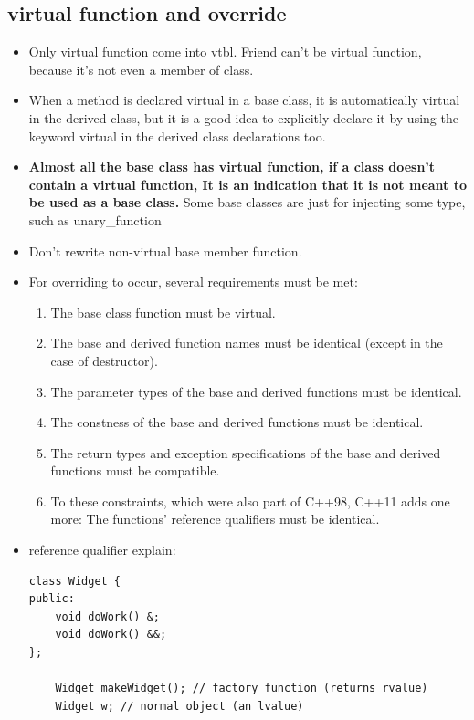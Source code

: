 \documentclass[a4paper,11pt,twoside]{book}
\begin{document}
\subsection{virtual function and override}
\begin{itemize}
	
	\item Only virtual function come into vtbl. Friend can't be virtual function, because it's not even a member of class.
	
	\item When a method is declared virtual in a base class, it is automatically virtual in the derived class, but it is a good idea to explicitly declare it by using the keyword virtual in the derived class declarations too.
	
	\item \textbf{Almost all the base class has virtual function, if a class doesn't contain a virtual function, It is an indication that it is not meant to be used as a base class.} Some base classes are just for injecting some type, such as unary\_function 
	
	\item Don't rewrite non-virtual base member function.
	
	\item For overriding to occur, several requirements must be met:
	\begin{enumerate}
		\item The base class function must be virtual.
		\item The base and derived function names must be identical (except in the case of
		destructor).
		\item The parameter types of the base and derived functions must be identical.
		\item The constness of the base and derived functions must be identical.
		\item The return types and exception specifications of the base and derived functions
		must be compatible.
		\item To these constraints, which were also part of C++98, C++11 adds one more: The functions' reference qualifiers must be identical.
	\end{enumerate}
	\item reference qualifier explain:
\begin{lstlisting}
class Widget {
public:
	void doWork() &; 
	void doWork() &&; 
}; 
	
	Widget makeWidget(); // factory function (returns rvalue)
	Widget w; // normal object (an lvalue)
	

\end{lstlisting}
\end{itemize}
\end{document}
